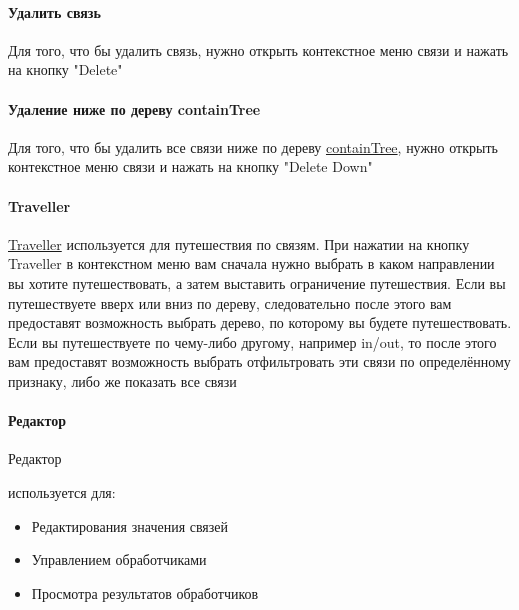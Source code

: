 \documentclass{article}
\begin{document}
\paragraph{Удалить связь}
Для того, что бы удалить связь, нужно открыть контекстное меню связи и нажать
на кнопку "Delete"
\paragraph{Удаление ниже по дереву
      containTree}\hypertarget{containTree.Deletion.Example}{}
Для того, что бы удалить все связи ниже по дереву
\hyperlink{containTree.Description}{containTree}, нужно открыть контекстное
меню связи
и нажать на кнопку "Delete Down"
\paragraph*{Traveller}
\hyperlink{Traveller.Description}{Traveller} используется для путешествия по
связям.
При нажатии на кнопку Traveller в контекстном меню вам сначала нужно выбрать в
каком направлении вы хотите путешествовать, а затем выставить ограничение
путешествия.
Если вы путешествуете вверх или вниз по дереву, следовательно после этого вам
предоставят возможность выбрать дерево, по которому вы будете путешествовать.
Если вы путешествуете по чему-либо другому, например in/out, то после этого вам
предоставят возможность выбрать отфильтровать эти связи по определённому
признаку, либо же показать все связи
\paragraph*{Редактор}
\hypertarget{Editor.Description}{Редактор} используется для:
\begin{itemize}
      \item Редактирования значения связей
      \item Управлением обработчиками
      \item Просмотра результатов обработчиков
\end{itemize}
\end{document}
